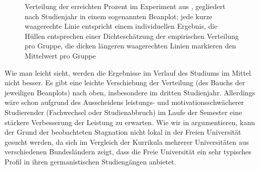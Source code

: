 \begin{figure}[htpb]
  \centering
  \caption{Verteilung der erreichten Prozent im Experiment aus \citet{SchaeferSayatz2017a}, gegliedert nach Studienjahr in einem sogenannten Beanplot; jede kurze waagerechte Linie entspricht einem individuellen Ergebnis, die Hüllen entsprechen einer Dichteschätzung der empirischen Verteilung pro Gruppe, die dicken längeren waagerechten Linien markieren den Mittelwert pro Gruppe}
  \label{fig:grammatikkentnissevonstudierenden002}
\end{figure}

Wie man leicht sieht, werden die Ergebnisse im Verlauf des Studiums im Mittel nicht besser.
Es gibt eine leichte Verschiebung der Verteilung (des Bauchs der jeweiligen Beanplots) nach oben, insbesondere im dritten Studienjahr.
Allerdings wäre schon aufgrund des Ausscheidens leistungs- und motivationsschwächerer Studierender (Fachwechsel oder Studienabbruch) im Laufe der Semester eine stärkere Verbesserung der Leistung zu erwarten.
Wie wir in \citet[242--243]{SchaeferSayatz2017a} argumentieren, kann der Grund der beobachteten Stagnation nicht lokal in der Freien Universität gesucht werden, da sich im Vergleich der Kurrikula mehrerer Universitäten aus verschiedenen Bundesländern zeigt, dass die Freie Universität ein sehr typisches Profil in ihren germanistischen Studiengängen anbietet.

